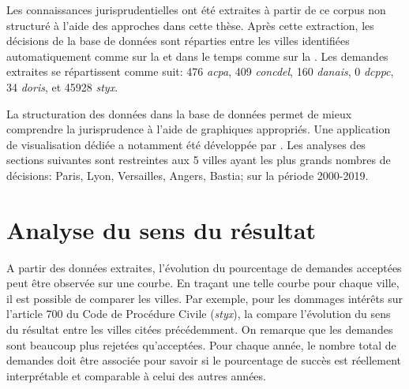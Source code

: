 Les connaissances jurisprudentielles ont été extraites à partir de ce corpus non structuré à l'aide des approches dans cette thèse. Après cette extraction, les décisions de la base de données sont réparties entre les villes identifiées automatiquement comme sur la  et dans le temps comme sur la . Les demandes extraites se répartissent comme suit: 476 \textit{acpa}, 409 \textit{concdel}, 160 \textit{danais}, 0 \textit{dcppc}, 34 \textit{doris}, et 45928 \textit{styx}.  



La structuration des données dans la base de données permet de mieux comprendre la jurisprudence à l'aide de graphiques appropriés. Une application de visualisation dédiée a notamment été développée  par \citet{PRYSIAZHNIUK2017jurisprudence-demo-web}.
Les analyses des sections suivantes sont restreintes aux 5 villes ayant les plus grands nombres de décisions: Paris, Lyon, Versailles, Angers, Bastia; sur la période 2000-2019.

\section{Analyse du sens du résultat}
A partir des données extraites, l'évolution du pourcentage de demandes acceptées  peut être observée sur une courbe. En traçant une telle courbe pour chaque ville, il est possible de comparer les villes.
Par exemple, pour les dommages intérêts sur l'article 700 du Code de Procédure Civile (\textit{styx}), la  compare l'évolution du sens du résultat entre les villes citées précédemment. On remarque que les demandes sont beaucoup plus rejetées qu'acceptées. Pour chaque année, le nombre total de demandes doit être associée pour savoir si le pourcentage de succès est réellement interprétable et comparable à celui des autres années.

